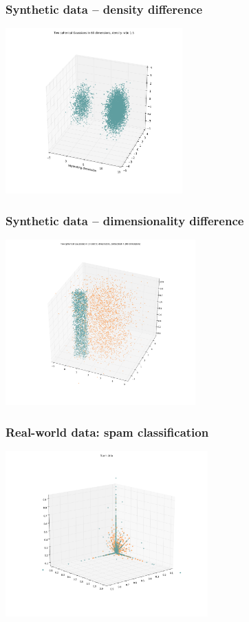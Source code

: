 \documentclass{beamer}
\begin{document}
\begin{frame}
\frametitle{Synthetic data -- density difference}
\centering
\includegraphics[height=2.5in]{./fig/gaussian_illustration.png}
\end{frame}

\begin{frame}
\frametitle{Synthetic data -- dimensionality difference}
\centering
\includegraphics[height=2.5in]{./fig/priya_illustration.png}
\end{frame}

\begin{frame}
\frametitle{Real-world data: spam classification}
\centering
\includegraphics[height=2.5in]{./fig/spam_illustration.png}
\end{frame}
\end{document}
